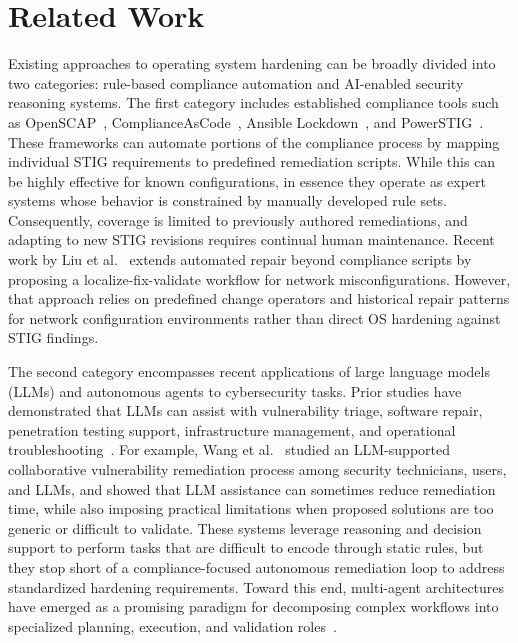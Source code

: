 \documentclass[pdflatex,sn-mathphys-num]{sn-jnl}%
\begin{document}

\section{Related Work}\label{relatedwork}

Existing approaches to operating system hardening can be broadly divided into two categories: rule-based compliance automation and AI-enabled security reasoning systems. The first category includes established compliance tools such as OpenSCAP~\cite{redhat_openscap}, ComplianceAsCode~\cite{complianceascode}, Ansible Lockdown~\cite{ansiblelockdown}, and PowerSTIG~\cite{powerstig}. These frameworks can automate portions of the compliance process by mapping individual STIG requirements to predefined remediation scripts. While this can be highly effective for known configurations, in essence they operate as expert systems whose behavior is constrained by manually developed rule sets. Consequently, coverage is limited to previously authored remediations, and adapting to new STIG revisions requires continual human maintenance. Recent work by Liu et al.~\cite{liu2024automatic} extends automated repair beyond compliance scripts by proposing a localize-fix-validate workflow for network misconfigurations. However, that approach relies on predefined change operators and historical repair patterns for network configuration environments rather than direct OS hardening against STIG findings.

The second category encompasses recent applications of large language models (LLMs) and autonomous agents to cybersecurity tasks. Prior studies have demonstrated that LLMs can assist with vulnerability triage, software repair, penetration testing support, infrastructure management, and operational troubleshooting~\cite{genkubesec,vrpilot,llmpatch,managing}. For example, Wang et al.~\cite{Wang2025LLM} studied an LLM-supported collaborative vulnerability remediation process among security technicians, users, and LLMs, and showed that LLM assistance can sometimes reduce remediation time, while also imposing practical limitations when proposed solutions are too generic or difficult to validate. These systems leverage reasoning and decision support to perform tasks that are difficult to encode through static rules, but they stop short of a compliance-focused autonomous remediation loop to address standardized hardening requirements. Toward this end, multi-agent architectures have emerged as a promising paradigm for decomposing complex workflows into specialized planning, execution, and validation roles~\cite{talebirad2023multi,agenticmindset}.
\end{document}
